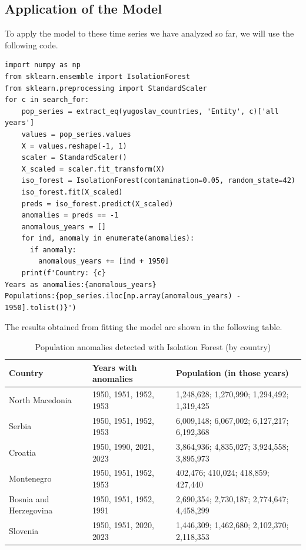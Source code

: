 \documentclass[a4paper,11pt]{article}
\begin{document}
\subsection{Application of the Model}
To apply the model to these time series we have analyzed so far, we will use the following code.
\begin{lstlisting}[style=Python, caption=Code for anomaly detection via Isolation Forest]
import numpy as np
from sklearn.ensemble import IsolationForest
from sklearn.preprocessing import StandardScaler
for c in search_for:
    pop_series = extract_eq(yugoslav_countries, 'Entity', c)['all years']
    values = pop_series.values
    X = values.reshape(-1, 1)
    scaler = StandardScaler()
    X_scaled = scaler.fit_transform(X)
    iso_forest = IsolationForest(contamination=0.05, random_state=42)
    iso_forest.fit(X_scaled)
    preds = iso_forest.predict(X_scaled)
    anomalies = preds == -1
    anomalous_years = []
    for ind, anomaly in enumerate(anomalies):
      if anomaly:
        anomalous_years += [ind + 1950]
    print(f'Country: {c}
Years as anomalies:{anomalous_years}
Populations:{pop_series.iloc[np.array(anomalous_years) - 1950].tolist()}')
\end{lstlisting}
\vspace{1cm}
The results obtained from fitting the model are shown in the following table.
\begin{table}[H]
\centering
\renewcommand{\arraystretch}{1.3}
\begin{tabular}{|l|p{5.5cm}|p{5.5cm}|}
\hline
\textbf{Country} & \textbf{Years with anomalies} & \textbf{Population (in those years)} \\
\hline
North Macedonia & 1950, 1951, 1952, 1953 & 1,248,628; 1,270,990; 1,294,492; 1,319,425 \\
\hline
Serbia & 1950, 1951, 1952, 1953 & 6,009,148; 6,067,002; 6,127,217; 6,192,368 \\
\hline
Croatia & 1950, 1990, 2021, 2023 & 3,864,936; 4,835,027; 3,924,558; 3,895,973 \\
\hline
Montenegro & 1950, 1951, 1952, 1953 & 402,476; 410,024; 418,859; 427,440 \\
\hline
Bosnia and Herzegovina & 1950, 1951, 1952, 1991 & 2,690,354; 2,730,187; 2,774,647; 4,458,299 \\
\hline
Slovenia & 1950, 1951, 2020, 2023 & 1,446,309; 1,462,680; 2,102,370; 2,118,353 \\
\hline
\end{tabular}
\caption{Population anomalies detected with Isolation Forest (by country)}
\label{tab:population_anomalies}
\end{table}
\end{document}
